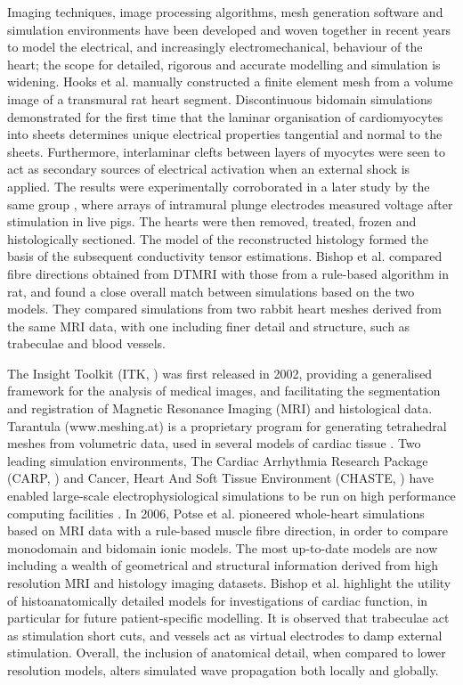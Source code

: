   Imaging techniques, image processing algorithms, mesh generation software and simulation environments have been developed and woven together in recent years to model the electrical, and increasingly electromechanical, behaviour of the heart; the scope for detailed, rigorous and accurate modelling and simulation is widening. Hooks et al. \cite{Hooks2002} manually constructed a finite element mesh from a volume image of a transmural rat heart segment.  Discontinuous bidomain simulations demonstrated for the first time that the laminar organisation of cardiomyocytes into sheets determines unique electrical properties tangential and normal to the sheets. Furthermore, interlaminar clefts between layers of myocytes were seen to act as secondary sources of electrical activation when an external shock is applied. The results were experimentally corroborated in a later study by the same group \cite{Hooks2007}, where arrays of intramural plunge electrodes measured voltage after stimulation in live pigs. The hearts were then removed, treated, frozen and histologically sectioned. The model of the reconstructed histology formed the basis of the subsequent conductivity tensor estimations. Bishop et al. \cite{Bishop2009} compared fibre directions obtained from DTMRI with those from a rule-based algorithm in rat, and found a close overall match between simulations based on the two models. They compared simulations from two rabbit heart meshes derived from the same MRI data, with one including finer detail and structure, such as trabeculae and blood vessels.
  
  The Insight Toolkit (ITK, \cite{Yoo2002}) was first released in 2002, providing a generalised framework for the analysis of medical images, and facilitating the segmentation and registration of Magnetic Resonance Imaging (MRI) and histological data. Tarantula (www.meshing.at) is a proprietary program for generating tetrahedral meshes from volumetric data, used in several models of cardiac tissue \cite{Bernabeu2008, Bishop2006, Plank2009a}. Two leading simulation environments, The Cardiac Arrhythmia Research Package (CARP, \cite{Vigmond2003}) and Cancer, Heart And Soft Tissue Environment (CHASTE, \cite{Pitt-Francis2008, Pitt-Francis2009, Pitt-Francis2009a}) have enabled large-scale electrophysiological simulations to be run on high performance computing facilities \cite{Bernabeu2008}. In 2006, Potse et al. \cite{Potse2006} pioneered whole-heart simulations based on MRI data with a rule-based muscle fibre direction, in order to compare monodomain and bidomain ionic models. The most up-to-date models \cite{Burton2006, Plank2009} are now including a wealth of geometrical and structural information derived from high resolution MRI and histology imaging datasets. Bishop et al. \cite{Bishop2009a} highlight the utility of histoanatomically detailed models for investigations of cardiac function, in particular for future patient-specific modelling. It is observed that trabeculae act as stimulation short cuts, and vessels act as virtual electrodes to damp external stimulation. Overall, the inclusion of anatomical detail, when compared to lower resolution models, alters simulated wave propagation both locally and globally.

